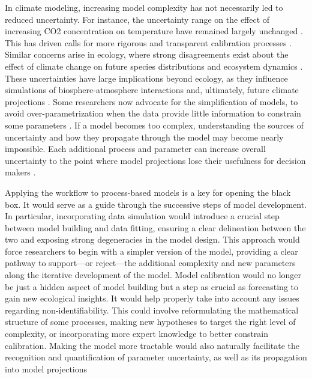 \documentclass[11pt]{article}
\begin{document}
In climate modeling, increasing model complexity has not necessarily led to reduced uncertainty. For instance, the uncertainty range on the effect of increasing CO2 concentration on temperature have remained largely unchanged \citep{Zelinka2020}. This has driven calls for more rigorous and transparent calibration processes \citep{balaji2022general}. Similar concerns arise in ecology, where strong disagreements exist about the effect of climate change on future species distributions \citep{Cheaib2012} and ecosystem dynamics \citep{Lovenduski2017}.
These uncertainties have large implications beyond ecology, as they influence simulations of biosphere-atmosphere interactions and, ultimately, future climate projections \citep{Bonan2018, simpson2025confronting}.
Some researchers now advocate for the simplification of models, to avoid over-parametrization when the data provide little information to constrain some parameters \citep{Wang2017, Harrison2021}. If a model becomes too complex, understanding the sources of uncertainty and how they propagate through the model may become nearly impossible.
Each additional process and parameter can increase overall uncertainty to the point where model projections lose their usefulness for decision makers \citep{Saltelli2020}.

Applying the workflow to process-based models is a key for opening the black box. It would serve as a guide through the successive steps of model development. In particular, incorporating data simulation would introduce a crucial step between model building and data fitting, ensuring a clear delineation between the two and exposing strong degeneracies in the model design. This approach would force researchers to begin with a simpler version of the model, providing a clear pathway to support---or reject---the additional complexity and new parameters along the iterative development of the model. 
Model calibration would no longer be just a hidden aspect of model building but a step as crucial as forecasting to gain new ecological insights. It would help properly take into account any issues regarding non-identifiability. This could involve reformulating the mathematical structure of some processes, making new hypotheses to target the right level of complexity, or incorporating more expert knowledge to better constrain calibration. Making the model more tractable would also naturally facilitate the recognition and quantification of parameter uncertainty, as well as its propagation into model projections
\end{document}
